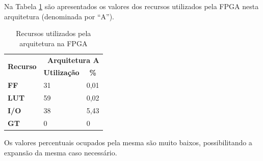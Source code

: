 \documentclass[11pt,a4paper]{article}
\begin{document}
	Na Tabela \ref{table:recursosA} são apresentados os valores dos recursos utilizados pela FPGA nesta arquitetura (denominada por ``A'').
		\begin{table}[h!]
			\centering
			\caption{Recursos utilizados pela arquitetura na FPGA}
				\label{table:recursosA}
				\begin{tabular}{l|ll}
					\hline
					\multicolumn{1}{c|}{\multirow{2}{*}{\textbf{Recurso}}} & \multicolumn{2}{r}{\textbf{Arquitetura A}} \\ \cline{2-3} 
					\multicolumn{1}{c|}{}                                  & \multicolumn{1}{c}{\textbf{Utilização}} & \multicolumn{1}{c}{\textbf{\%}} \\ \hline
					\textbf{FF}                                            & 31                                      & 0,01                            \\
					\textbf{LUT}                                           & 59                                      & 0,02                            \\
					\textbf{I/O}                                           & 38                                      & 5,43         			   		\\
					\textbf{GT}                                            & 0                                       & 0                               \\ \hline
				\end{tabular}%
		\end{table}
	
	Os valores percentuais ocupados pela mesma são muito baixos, possibilitando a expansão da mesma caso necessário. 
	
	
	
	
	
	
\end{document}

